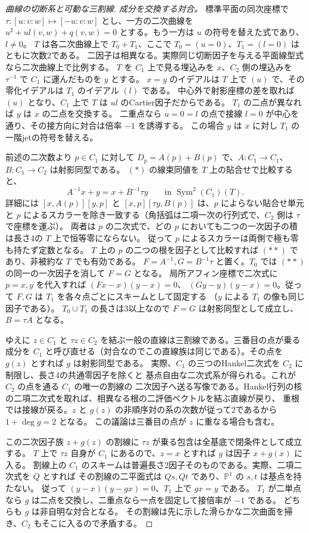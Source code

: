 \begin{proof}[曲線の切断系と可動な三割線]
\smallskip
\noindent\textit{成分を交換する対合。}
標準平面の同次座標で $\tau:[u:v:w]\mapsto[-u:v:w]$ とし、一方の二次曲線を
$u^2+u l(v,w)+q(v,w)=0$ とする。もう一方は $u$ の符号を替えた式であり、$l\ne0$。
$T$ は各二次曲線上で $T_0+T_1$、ここで $T_0=(u=0)$、$T_1=(l=0)$ はともに次数2である。
二因子は相異なる。実際同じ切断因子を与える平面線型式なら二次曲線上で比例する。
$T$ を $C_1$ 上で見る埋込みを $x$、$C_2$ 側の埋込みを $\tau^{-1}$ で $C_1$ に運んだものを $y$ とする。
$x=y$ のイデアルは $T$ 上で $(u)$ で、その零化イデアルは $T_1$ のイデアル $(l)$ である。
中心外で射影座標の差を取れば $(u)$ となり、$C_1$ 上で $T$ は $ul$ のCartier因子だからである。
$T_1$ の二点が異なれば $y$ は $x$ の二点を交換する。
二重点なら $u=0=l$ の点で接線 $l=0$ が中心を通り、その接方向に対合は倍率 $-1$ を誘導する。
この場合 $y$ は $x$ に対し $T_1$ の一階jetの符号を替える。

前述の二次数より $p\in C_1$ に対して $D_p=A(p)+B(p)$ で、$A:C_1\to C_1$、$B:C_1\to C_2$ は射影同型である。
$(*)$ の線束同値を $T$ 上の貼合せで比較すると、
\[
         A^{-1}x+y=x+B^{-1}\tau y\qquad\text{in }\operatorname{Sym}^2(C_1)(T).
\tag{**}
\]
詳細には $[x,A(p)][y,p]$ と $[x,p][\tau y,B(p)]$ は、$p$ によらない貼合せ単元と
$p$ によるスカラーを除き一致する（角括弧は二項一次の行列式で、$C_2$ 側は $\tau$ で座標を運ぶ）。
両者は $p$ の二次式で、どの $p$ においても二つの一次因子の積は長さ4の $T$ 上で恒等零にならない。
従って $p$ によるスカラーは両側で極も零も持たず定数となる。
$T$ 上の $p$ の二つの根を因子として比較すれば $(**)$ であり、非被約な $T$ でも有効である。
$F=A^{-1},G=B^{-1}\tau$ と置く。$T_0$ では $(**)$ の同一の一次因子を消して $F=G$ となる。
局所アフィン座標で二次式に $p=x,y$ を代入すれば $(Fx-x)(y-x)=0$、
$(Gy-y)(y-x)=0$。従って $F,G$ は $T_1$ を各々点ごとにスキームとして固定する
（$y$ による $T_1$ の像も同じ因子である）。
$T_0\cup T_1$ の長さは3以上なので $F=G$ は射影同型として成立し、$B=\tau A$ となる。

ゆえに $z\in C_1$ と $\tau z\in C_2$ を結ぶ一般の直線は三割線である。三番目の点が乗る成分を
$C_1$ と呼び直せる（対合なのでこの直線族は同じである）。その点を $g(z)$ とすれば $g$ は射影同型である。
実際、$C_1$ の三つのHankel二次式を $C_2$ に制限し、長さ4の共通零因子を除くと
基点自由な二次式系が得られる。これが $C_2$ の点を通る $C_1$ の唯一の割線の
二次因子へ送る写像である。Hankel行列の核の二項二次式を取れば、相異なる根の二評価ベクトルを結ぶ直線が戻り、
重根では接線が戻る。$z$ と $g(z)$ の非順序対の系の次数が従って2であるから $1+\deg g=2$ となる。
この議論は三番目の点が $z$ に重なる場合も含む。

この二次因子族 $z+g(z)$ の割線に $\tau z$ が乗る包含は全基底で閉条件として成立する。
$T$ 上で $\tau z$ 自身が $C_1$ にあるので、$z=x$ とすれば $y$ は因子 $x+g(x)$ に入る。
割線上の $C_1$ のスキームは普遍長さ2因子そのものである。実際、二項二次式を $Q$ とすれば
その割線の二平面式は $Qs,Qt$ であり、$\mathbb P^1$ の $s,t$ は基点を持たない。
従って $(y-x)(y-gx)=0$、$T_1$ 上で $gx=y$ である。
$T_1$ が二単点なら $g$ は二点を交換し、二重点なら一点を固定して接倍率が $-1$ である。
どちらも $g$ は非自明な対合となる。
その割線は先に示した滑らかな二次曲面を掃き、$C_2$ もそこに入るので矛盾する。
\end{proof}

